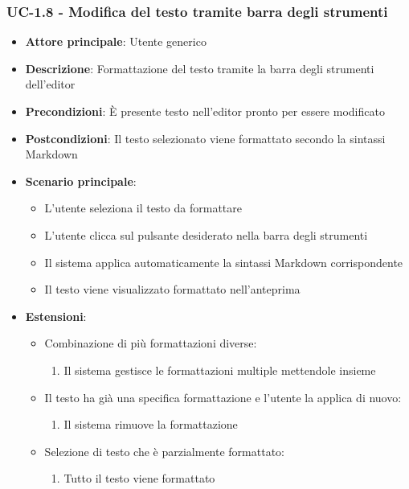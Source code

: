 \documentclass[11pt,a4paper]{article}
\begin{document}
\subsubsection{UC-1.8 - Modifica del testo tramite barra degli strumenti}
\begin{itemize}
    \item \textbf{Attore principale}: Utente generico
    \item \textbf{Descrizione}: Formattazione del testo tramite la barra degli strumenti dell'editor
    \item \textbf{Precondizioni}: È presente testo nell'editor pronto per essere modificato
    \item \textbf{Postcondizioni}: Il testo selezionato viene formattato secondo la sintassi Markdown
    \item \textbf{Scenario principale}:
        \begin{itemize}
            \item L'utente seleziona il testo da formattare
            \item L'utente clicca sul pulsante desiderato nella barra degli strumenti
            \item Il sistema applica automaticamente la sintassi Markdown corrispondente
            \item Il testo viene visualizzato formattato nell'anteprima
        \end{itemize}
    \item \textbf{Estensioni}:
        \begin{itemize}
            \item Combinazione di più formattazioni diverse:
                \begin{enumerate}
                    \item Il sistema gestisce le formattazioni multiple mettendole insieme
                \end{enumerate}
            \item Il testo ha già una specifica formattazione e l'utente la applica di nuovo:
                \begin{enumerate}
                    \item Il sistema rimuove la formattazione
                \end{enumerate}
            \item Selezione di testo che è parzialmente formattato:
                \begin{enumerate}
                    \item Tutto il testo viene formattato
                \end{enumerate}
        \end{itemize}
\end{itemize}
\end{document}
